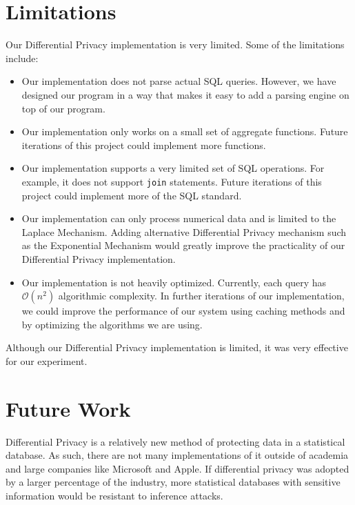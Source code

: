 \documentclass[conference,11pt]{IEEEtran}
\begin{document}
\section{Limitations}\label{sec:limitations}
Our Differential Privacy implementation is very limited. Some of the limitations
include:
\begin{itemize}
    \item Our implementation does not parse actual SQL queries. However, we
        have designed our program in a way that makes it easy to add a parsing
        engine on top of our program.
    \item Our implementation only works on a small set of aggregate functions.
        Future iterations of this project could implement more functions.
    \item Our implementation supports a very limited set of SQL operations. For
        example, it does not support \texttt{join} statements.  Future
        iterations of this project could implement more of the SQL standard.
    \item Our implementation can only process numerical data and is limited to
        the Laplace Mechanism. Adding alternative Differential Privacy mechanism
        such as the Exponential Mechanism would greatly improve the practicality
        of our Differential Privacy implementation.
    \item Our implementation is not heavily optimized. Currently, each query has
        $\mathcal{O}(n^2)$ algorithmic complexity. In further iterations of our
        implementation, we could improve the performance of our system using
        caching methods and by optimizing the algorithms we are using.
\end{itemize}

Although our Differential Privacy implementation is limited, it was very
effective for our experiment.

\section{Future Work}\label{sec:future-work}
Differential Privacy is a relatively new method of protecting data in a
statistical database. As such, there are not many implementations of it outside
of academia and large companies like Microsoft and Apple. If differential
privacy was adopted by a larger percentage of the industry, more statistical
databases with sensitive information would be resistant to inference attacks.
\end{document}
